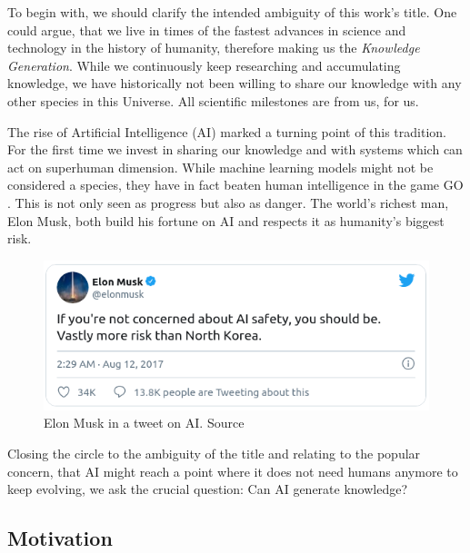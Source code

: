 

To begin with, we should clarify the intended ambiguity of this work's title. One could argue, that we live in times of the fastest advances in science and technology in the history of humanity, therefore making us the \textit{Knowledge Generation}. While we continuously keep researching and accumulating knowledge, we have historically not been willing to share our knowledge with any other species in this Universe. All scientific milestones are from us, for us. 

The rise of Artificial Intelligence (AI) marked a turning point of this tradition. For the first time we invest in sharing our knowledge and with systems which can act on superhuman dimension. While machine learning models might not be considered a species, they have in fact beaten human intelligence in the game GO \cite{silver_mastering_2017}. This is not only seen as progress but also as danger. The world's richest man, Elon Musk, both build his fortune on AI and respects it as humanity's biggest risk. 

\begin{figure}[H]
    \centering
    \includegraphics[height=.21\textwidth, keepaspectratio]{data/images/ElonMusk.png}
    \caption{Elon Musk in a tweet on AI. Source \cite{noauthor_elon_nodate}}
    \label{fig1:Elon}
\end{figure}


%     


Closing the circle to the ambiguity of the title and relating to the popular concern, that AI might reach a point where it does not need humans anymore to keep evolving, we ask the crucial question: Can AI generate knowledge? 


\subsection{Motivation}

